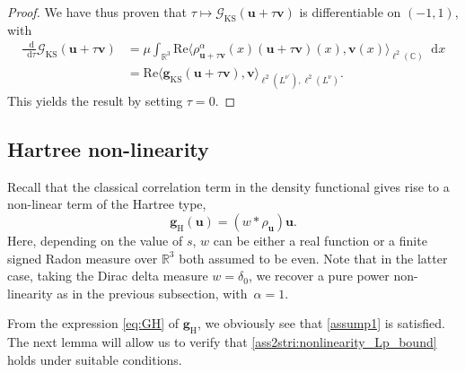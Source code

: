 \documentclass[12pt,a4paper]{amsart}
\numberwithin{equation}{section}
\newcommand{\ulu}{\boldsymbol{u}}
\newcommand{\ulv}{\boldsymbol{v}}
\newcommand{\ulg}{\boldsymbol{g}}
\newcommand*\diff{\mathop{}\!\mathrm{d}}
\begin{document}
\begin{proof}
		We have thus proven that $\tau\mapsto \mathscr{G}_{\mathrm{KS}}(\ulu + \tau \ulv)$ is differentiable on $(-1,1)$, with
		\begin{align*}
			\frac{\diff }{\diff \tau} \mathscr{G}_{\mathrm{KS}}(\ulu + \tau \ulv) 
			& = \mu \int_{\mathbb{R}^3} \mathrm{Re} \langle \rho_{\ulu + \tau \ulv}^{\alpha} (x) (\ulu + \tau \ulv)(x) , \ulv(x)  \rangle_{\ell^2(\mathbb{C})} \diff  x \\
			& =  \mathrm{Re} \langle \ulg_{\mathrm{KS}}(\ulu + \tau \ulv), \ulv \rangle_{\ell^2(L^{\nu^\prime}) , \ell^2(L^{\nu}) } .
		\end{align*}
		This yields the result by setting $\tau=0$.
	\end{proof}
	
	
	\subsection{Hartree non-linearity}\label{subsec:convol}
	Recall that the classical correlation term in the density functional gives rise to a non-linear term of the Hartree type,    
	\begin{equation}\label{eq:GH}
		\ulg_{\mathrm{H}}(\ulu) = (w \ast \rho_{\ulu} )\ulu .
	\end{equation}
	Here, depending on the value of $s$, $ w $ can be either a real function or a finite signed Radon measure over $\mathbb{R}^3$ both assumed to be even. Note that in the latter case, taking the Dirac delta measure $w=\delta_0$, we recover a pure power non-linearity as in the previous subsection, with~$\alpha=1$.
	
	From the expression \eqref{eq:GH} of $\ulg_{\mathrm{H}}$, we obviously see that \ref{assump1} is satisfied. The next lemma will allow us to verify that \ref{ass2stri:nonlinearity_Lp_bound} holds under suitable conditions.
	
\end{document}
